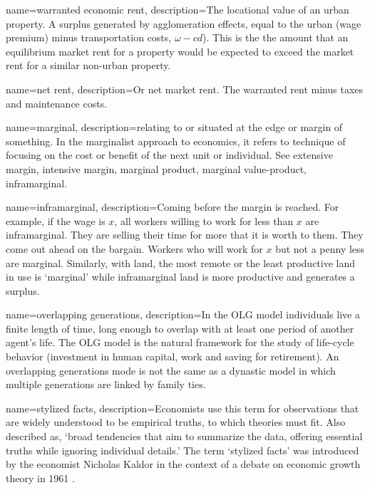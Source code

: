 {
name=warranted economic rent,
description={The locational value of an urban property. A surplus generated by \glspl{agglomeration effect}, equal to the urban (wage premium) minus transportation costs, $\omega-{c} d$). This is the the amount that an equilibrium market rent for a property would be expected to exceed the market rent for a similar non-urban property.}
}

{
name=net rent,
description={Or net market rent. The \gls{warranted rent} minus taxes and maintenance costs.}
}



{
name=marginal,
description={relating to or situated at the edge or margin of something. In the marginalist approach to economics, it  refers to technique of focusing on the cost or benefit of the next unit or individual. See \gls{extensive margin}, \gls{intensive margin}, \gls{marginal product}, \gls{marginal value-product}, \gls{inframarginal}.}
}

{
name=inframarginal,
description={Coming before the margin is reached. For example, if the wage is $x$, all workers willing to work for less than $x$ are inframarginal. They are selling their time for more that it is worth to them. They come out ahead on the bargain. Workers who will work for $x$ but not a penny less are marginal. Similarly, with land, the most remote or the least productive land in use is `marginal' while  inframarginal land is more productive and generates a \gls{surplus}.}
}

{
name=overlapping generations,
description={In the \gls{OLG} model individuals live a finite length of time, long enough to overlap with at least one period of another agent's life. The OLG model is the natural framework for the study of life-cycle behavior (investment in human capital, work and saving for retirement). An overlapping generations mode is not the same as a \gls{dynastic model} in which multiple generations are linked by family ties. }
}

{
name=stylized facts,
description={Economists use this term for observations that are widely understood to be empirical truths, to which theories must fit.  Also described as, `broad tendencies that aim to summarize the data, offering essential truths while ignoring individual details.' The term `stylized facts' was introduced by the economist Nicholas Kaldor in the context of a debate on economic growth theory in 1961 \cite{kaldorCapitalAccumulationEconomic1961}.}
}

